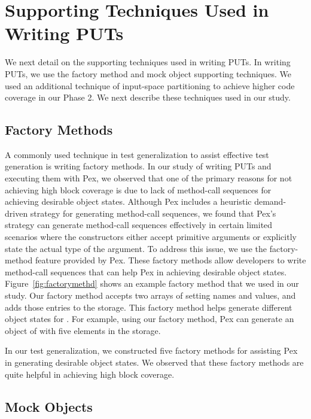 \section{Supporting Techniques Used in Writing PUTs}
\label{sec:helper}

We next detail on the supporting techniques used in writing PUTs. In writing PUTs, we use the factory method and mock object supporting techniques. We used an additional technique of input-space partitioning to achieve higher code coverage in our Phase 2. We next describe these techniques used in our study.
\subsection{Factory Methods} 
\label{sec:factory}

A commonly used technique in test generalization to assist effective test generation is writing factory methods. In our study of writing PUTs and executing them with Pex, we observed that one of the primary reasons for not achieving high block coverage is due to lack of method-call sequences for achieving desirable object states. Although Pex includes a heuristic demand-driven strategy for generating method-call sequences, we found that Pex's strategy can generate method-call sequences effectively in certain limited scenarios where the constructors either accept primitive arguments or explicitly state the actual type of the argument. To address this issue, we use the factory-method feature provided by Pex. These factory methods allow developers to write method-call sequences that can help Pex in achieving desirable object states. Figure~\ref{fig:factorymethd} shows an example factory method that we used in our study. Our factory method accepts two arrays of setting names and values, and adds those entries to the storage. This factory method helps generate different object states for . For example, using our factory method, Pex can generate an object of  with five elements in the storage. 

In our test generalization, we constructed five factory methods for assisting Pex in generating desirable object states.  We observed that these factory methods are quite helpful in achieving high block coverage. 
\subsection{Mock Objects} 
\label{sec:mock}


